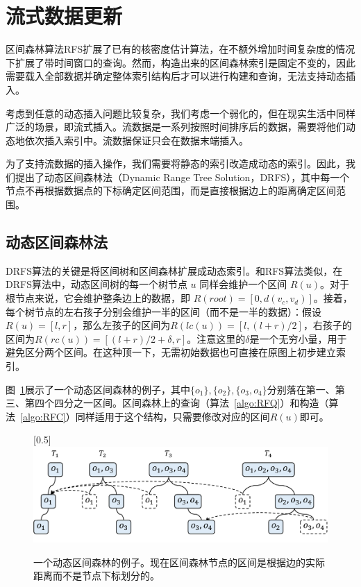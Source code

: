 \section{流式数据更新}
\label{sec7:dynamic}

	区间森林算法RFS扩展了已有的核密度估计算法，在不额外增加时间复杂度的情况下扩展了带时间窗口的查询。然而，构造出来的区间森林索引是固定不变的，因此需要载入全部数据并确定整体索引结构后才可以进行构建和查询，无法支持动态插入。

	考虑到任意的动态插入问题比较复杂，我们考虑一个弱化的，但在现实生活中同样广泛的场景，即流式插入。流数据是一系列按照时间排序后的数据，需要将他们动态地依次插入索引中。流数据保证只会在数据末端插入。

	为了支持流数据的插入操作，我们需要将静态的索引改造成动态的索引。因此，我们提出了动态区间森林法（Dynamic Range Tree Solution，DRFS），其中每一个节点不再根据数据点的下标确定区间范围，而是直接根据边上的距离确定区间范围。

\subsection{动态区间森林法}

	DRFS算法的关键是将区间树和区间森林扩展成动态索引。和RFS算法类似，在DRFS算法中，动态区间树的每一个树节点 $u$ 同样会维护一个区间 $R(u)$。对于根节点来说，它会维护整条边上的数据，即 $R(root) = [0, d(v_c, v_d)]$。接着，每个树节点的左右孩子分别会维护一半的区间（而不是一半的数据）：假设$R(u) = [l, r]$，那么左孩子的区间为$R(lc(u)) = [l, (l + r) / 2]$，右孩子的区间为$R(rc(u)) = [(l + r) / 2 + \delta, r]$。注意这里的$\delta$是一个无穷小量，用于避免区分两个区间。在这种顶一下，无需初始数据也可直接在原图上初步建立索引。

	图~\ref{fig:DRFS_1}展示了一个动态区间森林的例子，其中$\{o_1\}, \{o_2\}, \{o_3, o_4\}$分别落在第一、第三、第四个四分之一区间。区间森林上的查询（算法~\ref{algo:RFQ}）和构造（算法~\ref{algo:RFC}）同样适用于这个结构，只需要修改对应的区间$R(u)$即可。

\begin{figure}[h]\centering
	\scalebox{0.5}[0.5]{\includegraphics{./figures/DRFS_1.pdf}}
	\caption{一个动态区间森林的例子。现在区间森林节点的区间是根据边的实际距离而不是节点下标划分的。}
	\label{fig:DRFS_1}
\end{figure}

